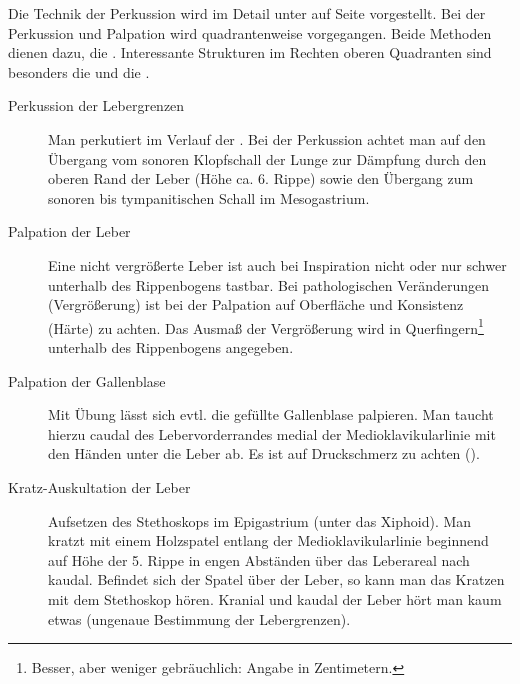 {Die Technik der Perkussion wird im Detail unter
 auf
Seite \pageref{topic:perkussion} vorgestellt.
Bei der Perkussion und Palpation wird quadrantenweise
vorgegangen. Beide Methoden dienen dazu, die .
Interessante Strukturen im Rechten oberen Quadranten sind
besonders die  und die . 

\begin{description}
  \item[Perkussion der Lebergrenzen]
Man perkutiert im Verlauf der .
Bei der Perkussion achtet man auf den Übergang vom sonoren
Klopfschall der Lunge zur Dämpfung durch den oberen Rand der
Leber (Höhe ca. 6. Rippe) sowie den Übergang zum sonoren bis
tympanitischen Schall im Mesogastrium.
\item[Palpation der Leber]
Eine nicht vergrößerte Leber ist auch bei Inspiration nicht oder
nur schwer unterhalb des Rippenbogens tastbar. Bei pathologischen
Veränderungen (Vergrößerung) ist bei der Palpation auf
Oberfläche und Konsistenz (Härte) zu achten. Das Ausmaß der
Vergrößerung wird in Querfingern\footnote{Besser, aber
weniger gebräuchlich: Angabe in Zentimetern.} unterhalb des
Rippenbogens angegeben.
\item[Palpation der Gallenblase]
Mit Übung lässt sich evtl. die gefüllte
Gallenblase palpieren. Man taucht hierzu caudal des
Lebervorderrandes medial der Medioklavikularlinie mit den
Händen unter die Leber ab. Es ist auf Druckschmerz zu achten
(). 
\item[Kratz-Auskultation der Leber]
Aufsetzen des Stethoskops im Epigastrium (unter das Xiphoid). Man kratzt
mit einem Holzspatel entlang der Medioklavikularlinie beginnend auf
Höhe der 5. Rippe in engen Abständen über das Leberareal nach
kaudal. Befindet sich der Spatel über der Leber, so kann man das
Kratzen mit dem Stethoskop hören. Kranial und kaudal der Leber hört
man kaum etwas (ungenaue Bestimmung der Lebergrenzen).
\end{description}

}{
\begin{PkuBefunde}[]
  \item[\SymbolPkuNormal] 
\end{PkuBefunde}
}{}{}{}


